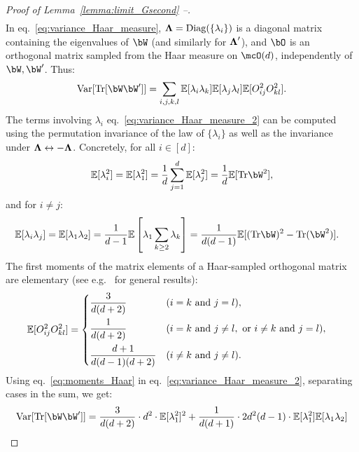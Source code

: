 \begin{proof}[Proof of Lemma~\ref{lemma:limit_Gsecond} --]
\begin{align}
\end{align}
In eq.~\eqref{eq:variance_Haar_measure}, ${\boldsymbol{\Lambda}} = \mathrm{Diag}(\{\lambda_i\})$ is a diagonal matrix containing the eigenvalues of $\bW$ (and similarly for ${\boldsymbol{\Lambda}}'$), 
and $\bO$ is an orthogonal matrix sampled from the Haar measure on $\mcO(d)$, independently of $\bW, \bW'$.
Thus:
\begin{align}\label{eq:variance_Haar_measure_2}
   \textrm{Var}[\Tr[\bW \bW']] = \sum_{i,j,k,l} \EE[\lambda_i \lambda_k] \EE[\lambda_j \lambda_l] \EE[O_{ij}^2 O_{kl}^2].
\end{align}
The terms involving $\lambda_i$ eq.~\eqref{eq:variance_Haar_measure_2} can be computed using the permutation invariance of the law of $\{\lambda_i\}$ as well as the invariance under ${\boldsymbol{\Lambda}} \leftrightarrow - {\boldsymbol{\Lambda}}$. 
Concretely, for all $i \in [d]$:
\begin{align}\label{eq:EE_lambdai2}
    \EE[\lambda_i^2] = \EE[\lambda_1^2] = \frac{1}{d} \sum_{j=1}^d \EE[\lambda_j^2] = \frac{1}{d} \EE[\Tr \bW^2],
\end{align}
and for $i \neq j$:
\begin{align}\label{eq:EE_lambdailambdaj}
    \EE[\lambda_i \lambda_j] &= \EE[\lambda_1 \lambda_2] = \frac{1}{d-1} \EE\left[\lambda_1 \sum_{k \geq 2} \lambda_k\right]
    = \frac{1}{d(d-1)} \EE[(\Tr \bW)^2 - \Tr(\bW^2)].
\end{align}
The first moments of the matrix elements of a Haar-sampled orthogonal matrix are elementary (see e.g.\ \cite{banica2011polynomial} for general results):
\begin{align}\label{eq:moments_Haar}
    \mathbb{E}[O_{ij}^2 O_{kl}^2] &= \begin{dcases}
        \frac{3}{d(d+2)} &(i = k \textrm{ and } j = l), \\
        \frac{1}{d(d+2)} &(i = k \textrm{ and } j \neq l, \textrm{ or } i \neq k \textrm{ and } j = l), \\
        \frac{d+1}{d(d-1)(d+2)} &(i \neq k \textrm{ and } j \neq l).
    \end{dcases}
\end{align}
Using eq.~\eqref{eq:moments_Haar} in eq.~\eqref{eq:variance_Haar_measure_2}, separating 
cases in the sum, we get:
\begin{align}\label{eq:variance_Haar_measure_3}
    \nonumber
   \textrm{Var}[\Tr[\bW \bW']] &= 
   \frac{3}{d(d+2)} \cdot d^2 \cdot \EE[\lambda_1^2]^2 + 
   \frac{1}{d(d+1)} \cdot 2 d^2 (d-1) \cdot \EE[\lambda_1^2] \EE[\lambda_1 \lambda_2] \\ 

\end{align}
\end{proof}
